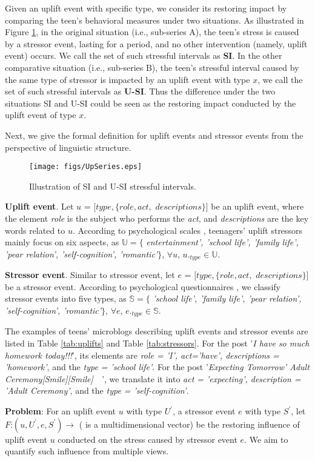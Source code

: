 Given an uplift event with specific type,
we consider its restoring impact by comparing the teen's behavioral measures under two situations.
As illustrated in Figure \ref{fig:SI},
in the original situation (i.e., sub-series A),
the teen's stress is caused by a stressor event, lasting for a period,
and no other intervention (namely, uplift event) occurs.
We call the set of such stressful intervals as \textbf{SI}.
In the other comparative situation (i.e., sub-series B),
the teen's stressful interval caused by the same type of stressor is impacted by an uplift event with type $x$,
we call the set of such stressful intervals as \textbf{U-SI}.
Thus the difference under the two situations SI and U-SI could be seen as the restoring impact conducted by the uplift event of type $x$.

Next, we give the formal definition for uplift events and stressor events from the perspective of linguistic structure.

\begin{figure}
\centering
\caption{Illustration of SI and U-SI stressful intervals.}
\texttt{[image: figs/UpSeries.eps]}
\label{fig:SI}
\end{figure}
\begin{definition}
\textbf{Uplift event}.
Let $u$ = $[type,\{role, act,$ $descriptions\}]$ be an uplift event,
where the element \emph{role} is the subject who performs the \emph{act},
and \emph{descriptions} are the key words related to $u$.
According to psychological scales \cite{hassles,Jun2008Influence},
teenagers' uplift stressors mainly focus on six aspects,
as $\mathbb{U} =\{$ \emph{entertainment', 'school life', 'family life',
'pear relation', 'self-cognition', 'romantic'}$\}$, $\forall u$, $u._{type} \in \mathbb{U}$.
\end{definition}

\begin{definition}
\textbf{Stressor event}.
Similar to stressor event,
let $e$ = $[type,\{role, act,$ $descriptions\}]$ be a stressor event.
According to psychological questionnaires \cite{Kanner1981Comparison, scale1, scale2, scale3},
we classify stressor events into five types, as $\mathbb{S}=\{$ \emph{'school life', 'family life',
'pear relation', 'self-cognition', 'romantic'}$\}$, $\forall e$, $e._{type} \in \mathbb{S}$.
\end{definition}

The examples of teens' microblogs describing uplift events and stressor events are listed in Table \ref{tab:uplifts} and Table \ref{tab:stressors}.
For the post '\emph{I have so much homework today!!!}', its elements are \emph{role = 'I', act='have', descriptions = 'homework'}, and the \emph{type = 'school life'}.
For the post '\emph{Expecting Tomorrow' Adult Ceremony[Smile][Smile]~~}', we translate it into \emph{act = 'expecting', description = 'Adult Ceremony'}, and the \emph{type = 'self-cognition'}.

\textbf{Problem}: For an uplift event $u$ with type $U^{'}$,
a stressor event $e$ with type $S^{'}$,
let $F$:$(u, U^{'}, e, S^{'}) \rightarrow $ 
( is a multidimensional vector) be the restoring influence of uplift event $u$
conducted on the stress caused by stressor event $e$.
We aim to quantify such influence  from multiple views.
